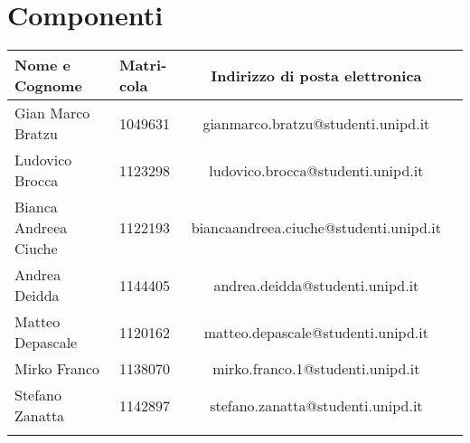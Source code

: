 \section{Componenti}
\label{componenti}
		\begin{tabularx}{\textwidth}{|X|X|c|X|}
			\hline
			\textbf{Nome e Cognome} &\textbf{Matri-}\newline \textbf{cola} & \textbf{Indirizzo di posta elettronica} \\
			\hline 
			Gian Marco Bratzu & 1049631 &gianmarco.bratzu@studenti.unipd.it \\
			\hline
			Ludovico Brocca & 1123298 & ludovico.brocca@studenti.unipd.it \\
			\hline
			Bianca Andreea Ciuche & 1122193 & biancaandreea.ciuche@studenti.unipd.it \\
			\hline
			Andrea Deidda & 1144405 & andrea.deidda@studenti.unipd.it \\
			\hline
			Matteo Depascale & 1120162 & matteo.depascale@studenti.unipd.it \\
			\hline
			Mirko Franco & 1138070 &  mirko.franco.1@studenti.unipd.it \\
			\hline
			Stefano Zanatta & 1142897 & stefano.zanatta@studenti.unipd.it \\
			\hline
			\caption{Componenti}
		\end{tabularx}
